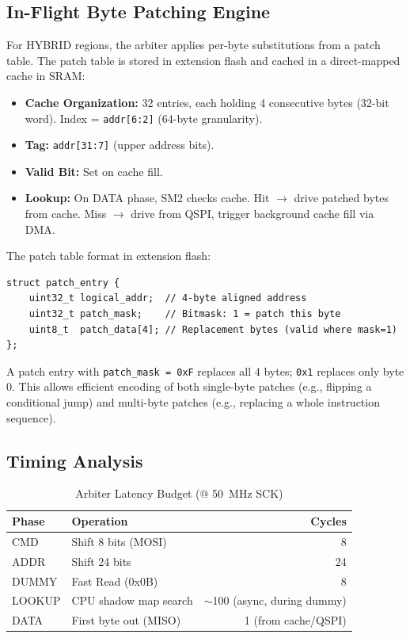 \subsection{In-Flight Byte Patching Engine}
For HYBRID regions, the arbiter applies per-byte substitutions from a patch table. The patch table is stored in extension flash and cached in a direct-mapped cache in \rp \ac{SRAM}:
\begin{itemize}
    \item \textbf{Cache Organization:} 32 entries, each holding 4 consecutive bytes (32-bit word). Index = \texttt{addr[6:2]} (64-byte granularity).
    \item \textbf{Tag:} \texttt{addr[31:7]} (upper address bits).
    \item \textbf{Valid Bit:} Set on cache fill.
    \item \textbf{Lookup:} On DATA phase, SM2 checks cache. Hit $\to$ drive patched bytes from cache. Miss $\to$ drive from QSPI, trigger background cache fill via DMA.
\end{itemize}

The patch table format in extension flash:
\begin{lstlisting}[style=vbfcStyle, caption={Patch Table Entry (8 bytes)}, label={lst:patch_entry}]
struct patch_entry {
    uint32_t logical_addr;  // 4-byte aligned address
    uint32_t patch_mask;    // Bitmask: 1 = patch this byte
    uint8_t  patch_data[4]; // Replacement bytes (valid where mask=1)
};
\end{lstlisting}

A patch entry with \texttt{patch\_mask = 0xF} replaces all 4 bytes; \texttt{0x1} replaces only byte 0. This allows efficient encoding of both single-byte patches (e.g., flipping a conditional jump) and multi-byte patches (e.g., replacing a whole instruction sequence).

\subsection{Timing Analysis}
\begin{table}[h]
\centering
\caption{Arbiter Latency Budget (@ \SI{50}{MHz} SCK)}
\label{tab:timing_budget}
\begin{tabular}{@{}llr@{}}
\toprule
\textbf{Phase} & \textbf{Operation} & \textbf{Cycles} \\
\midrule
CMD      & Shift 8 bits (MOSI) & 8 \\
ADDR     & Shift 24 bits       & 24 \\
DUMMY    & Fast Read (0x0B)    & 8 \\
LOOKUP   & CPU shadow map search & $\sim$100 (async, during dummy) \\
DATA     & First byte out (MISO) & 1 (from cache/QSPI) \\
\bottomrule
\end{tabular}
\end{table}

